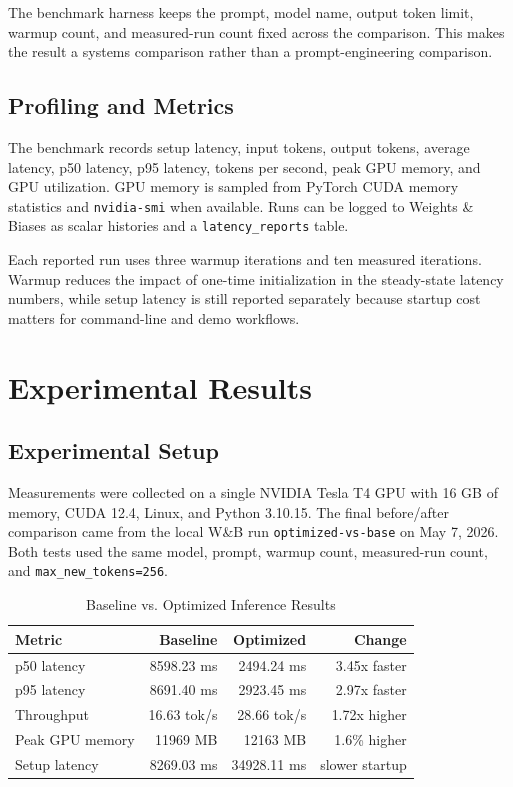 \documentclass[conference]{IEEEtran}
\begin{document}
The benchmark harness keeps the prompt, model name, output token limit, warmup count, and measured-run count fixed across the comparison. This makes the result a systems comparison rather than a prompt-engineering comparison.

\subsection{Profiling and Metrics}

The benchmark records setup latency, input tokens, output tokens, average latency, p50 latency, p95 latency, tokens per second, peak GPU memory, and GPU utilization. GPU memory is sampled from PyTorch CUDA memory statistics and \texttt{nvidia-smi} when available. Runs can be logged to Weights \& Biases as scalar histories and a \texttt{latency\_reports} table.

Each reported run uses three warmup iterations and ten measured iterations. Warmup reduces the impact of one-time initialization in the steady-state latency numbers, while setup latency is still reported separately because startup cost matters for command-line and demo workflows.

\section{Experimental Results}

\subsection{Experimental Setup}

Measurements were collected on a single NVIDIA Tesla T4 GPU with 16 GB of memory, CUDA 12.4, Linux, and Python 3.10.15. The final before/after comparison came from the local W\&B run \texttt{optimized-vs-base} on May 7, 2026. Both tests used the same model, prompt, warmup count, measured-run count, and \texttt{max\_new\_tokens=256}.

\begin{table}[htbp]
\caption{Baseline vs. Optimized Inference Results}
\begin{center}
\begin{tabular}{|l|r|r|r|}
\hline
\textbf{Metric} & \textbf{Baseline} & \textbf{Optimized} & \textbf{Change}\\
\hline
p50 latency & 8598.23 ms & 2494.24 ms & 3.45x faster\\
\hline
p95 latency & 8691.40 ms & 2923.45 ms & 2.97x faster\\
\hline
Throughput & 16.63 tok/s & 28.66 tok/s & 1.72x higher\\
\hline
Peak GPU memory & 11969 MB & 12163 MB & 1.6\% higher\\
\hline
Setup latency & 8269.03 ms & 34928.11 ms & slower startup\\
\hline
\end{tabular}
\label{tab:results}
\end{center}
\end{table}
\end{document}
